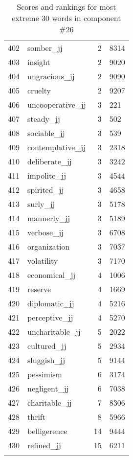 \begin{longtable}[!htbp]{| rlr@{.}l |}
    402 & somber\_jj & 2 & 8314 \\
    403 & insight & 2 & 9020 \\
    404 & ungracious\_jj & 2 & 9090 \\
    405 & cruelty & 2 & 9207 \\
    406 & uncooperative\_jj & 3 & 221 \\
    407 & steady\_jj & 3 & 502 \\
    408 & sociable\_jj & 3 & 539 \\
    409 & contemplative\_jj & 3 & 2318 \\
    410 & deliberate\_jj & 3 & 3242 \\
    411 & impolite\_jj & 3 & 4544 \\
    412 & spirited\_jj & 3 & 4658 \\
    413 & surly\_jj & 3 & 5178 \\
    414 & mannerly\_jj & 3 & 5189 \\
    415 & verbose\_jj & 3 & 6708 \\
    416 & organization & 3 & 7037 \\
    417 & volatility & 3 & 7170 \\
    418 & economical\_jj & 4 & 1006 \\
    419 & reserve & 4 & 1669 \\
    420 & diplomatic\_jj & 4 & 5216 \\
    421 & perceptive\_jj & 4 & 5270 \\
    422 & uncharitable\_jj & 5 & 2022 \\
    423 & cultured\_jj & 5 & 2934 \\
    424 & sluggish\_jj & 5 & 9144 \\
    425 & pessimism & 6 & 3174 \\
    426 & negligent\_jj & 6 & 7038 \\
    427 & charitable\_jj & 7 & 8306 \\
    428 & thrift & 8 & 5966 \\
    429 & belligerence & 14 & 9444 \\
    430 & refined\_jj & 15 & 6211 \\
    \hline
    \caption{Scores and rankings for most extreme 30 words in component \#26} \\
\end{longtable}
